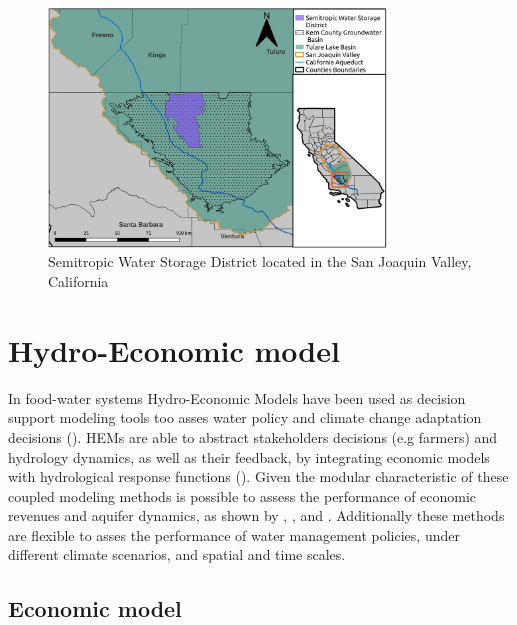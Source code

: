 \documentclass[11pt,a4paper]{article}
\begin{document}
\begin{figure}[H]
    \centering
    \includegraphics[width=0.8\textwidth]{Map_Semitropic.jpg}
    \caption{Semitropic Water Storage District located in the San Joaquin Valley, California}
    \label{fig:1}
\end{figure}

\section{Hydro-Economic model}

In food-water systems Hydro-Economic Models have been used as decision support modeling tools too asses water policy and climate change adaptation decisions (\cite{ward_hydroeconomic_2021,harou_hydro-economic_2009}). HEMs are able to abstract stakeholders decisions (e.g farmers) and hydrology dynamics, as well as their feedback, by integrating economic models with hydrological response functions (\cite{harou_hydro-economic_2009}). Given the modular characteristic of these coupled modeling methods is possible to assess the performance of economic revenues and aquifer dynamics, as shown by \textcite{macewan_hydroeconomic_2017}, \textcite{afshar_multi-objective_2020}, \textcite{rodriguez-flores_global_2022} and \textcite{graveline_combining_2020}. Additionally these methods are flexible to asses the performance of water management policies, under different climate scenarios, and spatial and time scales.

\subsection{Economic model}
\end{document}
